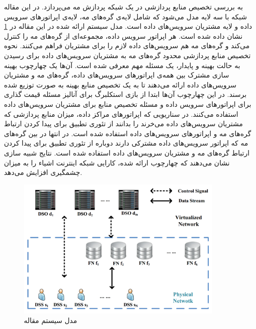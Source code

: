     \cite{zhang2017computing} به بررسی تخصیص منابع پردازشی در یک شبکه پردازش مه می‌پردازد.
    در این مقاله شبکه با سه لایه مدل می‌شود که شامل لایه‌ی گره‌های مه، لایه‌ی اپراتور‌های سرویس داده و لایه مشتریان سرویس‌های داده است.
    مدل سیستم ارائه شده در این مقاله در \cref{fig:chapter_2:system_model_zhang2017computing} نشان داده شده است.
    هر اپراتور سرویس داده، مجموعه‌ای از گره‌های مه را کنترل می‌کند و گره‌های مه هم سرویس‌های داده لازم را برای مشتریان فراهم می‌کنند.
    نحوه تخصیص منابع پردازشی محدود گره‌های مه به مشتریان سرویس‌های داده برای رسیدن به حالت بهینه و پایدار، یک مسئله مهم معرفی شده است.
    آن‌ها یک چهارچوب بهینه سازی مشترک بین همه‌ی اپراتور‌های سرویس‌های داده، گره‌های مه و مشتریان سرویس‌های داده ارائه می‌دهند تا به یک تخصیص منابع بهینه به صورت توزیع شده برسند.
    در این چهارچوب آن‌‌ها ابتدا از بازی استکلبرگ برای آنالیز مسئله قیمت گذاری برای اپراتور‌های سرویس داده و مسئله تخصیص منابع برای مشتریان سرویس‌های داده استفاده می‌کنند.
    در سناریویی که اپراتور‌های مراکز داده، میزان منابع پردازشی که مشتریان سرویس‌های داده می‌خرند را بدانند از تئوری تطبیق برای پیدا کردن ارتباط گره‌های مه و اپراتور‌های سرویس‌های داده استفاده شده است.
    در انتها در بین گره‌های مه که اپراتور سرویس‌های داده مشترکی دارند دوباره از تئوری تطبیق برای پیدا کردن ارتباط گره‌های مه و مشتریان سرویس‌های داده استفاده شده است.
    نتایج شبیه سازی نشان می‌دهند که چهارچوب ارائه شده، کارایی شبکه اینترنت اشیاء را به میزان چشمگیری افزایش می‌دهد.

    \begin{figure}[h]
      \centerline{\includegraphics[width=10cm]{graphics/chapter_2/system_model_zhang2017computing}}
      \caption{مدل سیستم مقاله \cite{zhang2017computing}}
      \label{fig:chapter_2:system_model_zhang2017computing}
    \end{figure}

